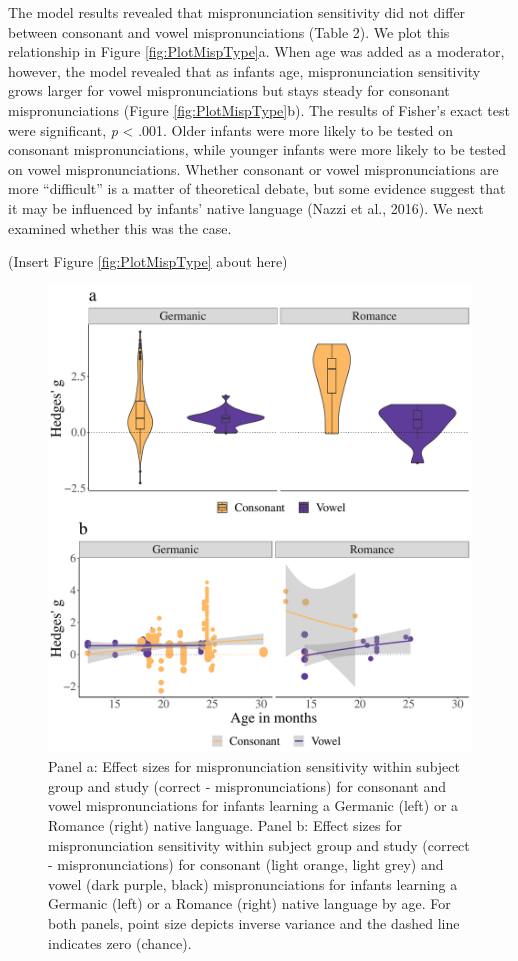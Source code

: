 \documentclass[
  english,
  man, noextraspace]{apa6}
\begin{document}
The model results revealed that mispronunciation sensitivity did not differ between consonant and vowel mispronunciations (Table 2). We plot this relationship in Figure \ref{fig:PlotMispType}a. When age was added as a moderator, however, the model revealed that as infants age, mispronunciation sensitivity grows larger for vowel mispronunciations but stays steady for consonant mispronunciations (Figure \ref{fig:PlotMispType}b). The results of Fisher's exact test were significant, \emph{p} \textless{} .001. Older infants were more likely to be tested on consonant mispronunciations, while younger infants were more likely to be tested on vowel mispronunciations. Whether consonant or vowel mispronunciations are more ``difficult'' is a matter of theoretical debate, but some evidence suggest that it may be influenced by infants' native language (Nazzi et al., 2016). We next examined whether this was the case.

(Insert Figure \ref{fig:PlotMispType} about here)

\begin{figure}
\centering
\includegraphics{VonHolzenBergmann_MPMetaAnalysis_files/figure-latex/PlotCVEffectLang-1.pdf}
\caption{\label{fig:PlotCVEffectLang}Panel a: Effect sizes for mispronunciation sensitivity within subject group and study (correct - mispronunciations) for consonant and vowel mispronunciations for infants learning a Germanic (left) or a Romance (right) native language. Panel b: Effect sizes for mispronunciation sensitivity within subject group and study (correct - mispronunciations) for consonant (light orange, light grey) and vowel (dark purple, black) mispronunciations for infants learning a Germanic (left) or a Romance (right) native language by age. For both panels, point size depicts inverse variance and the dashed line indicates zero (chance).}
\end{figure}
\end{document}
